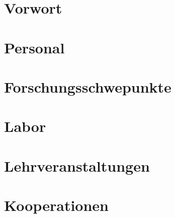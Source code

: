 
\chapter{Vorwort}


\chapter{Personal}





\chapter{Forschungsschwepunkte}


\chapter{Labor}


\chapter{Lehrveranstaltungen}



\chapter{Kooperationen}

%
%
%
%
%

